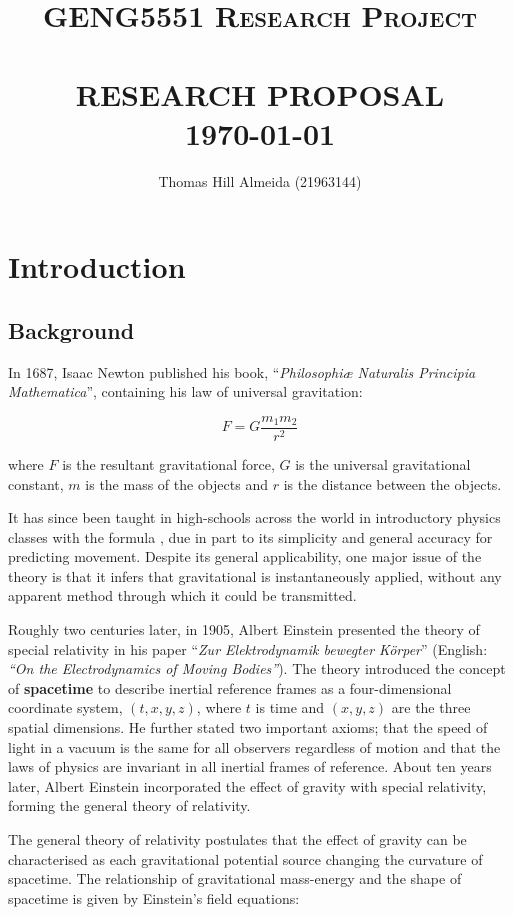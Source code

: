\documentclass{article}
\title{\normalsize \textsc{GENG5551 Research Project}
        \\ [1.5cm]
        \HRule{0.5pt} \\
        \LARGE \textbf{\uppercase{Research Proposal}}
        \HRule{2pt} \\ [0.5cm]
        \normalsize \today \vspace*{3\baselineskip}}
\author{Thomas Hill Almeida (21963144)}
\date{}
\begin{document}
\maketitle{}
\tableofcontents{}
\newpage{}

\section{Introduction}
\subsection{Background}

In 1687, Isaac Newton published his book, ``\textit{Philosophi\ae{} Naturalis Principia
Mathematica}'', containing his law of universal gravitation:

\begin{equation}
    F = G\dfrac{m_1m_2}{r^2}
\end{equation}

where \(F\) is the resultant gravitational force, \(G\) is the universal gravitational constant,
\(m\) is the mass of the objects and \(r\) is the distance between the objects.

It has since been taught in high-schools across the world in introductory physics classes with the
formula , due in part to its simplicity and general accuracy for predicting movement. Despite its
general applicability, one major issue of the theory is that it infers that gravitational is
instantaneously applied, without any apparent method through which it could be transmitted.

Roughly two centuries later, in 1905, Albert Einstein presented the theory of special relativity
in his paper ``\textit{Zur Elektrodynamik bewegter K{\"o}rper}'' (English: \textit{``On the
Electrodynamics of Moving Bodies''}). The theory introduced the concept of \textbf{spacetime} to
describe inertial reference frames as a four-dimensional coordinate system, \((t, x, y, z)\), where
$t$ is time and $(x, y, z)$ are the three spatial dimensions. He further stated two important
axioms; that the speed of light in a vacuum is the same for all observers regardless of motion and
that the laws of physics are invariant in all inertial frames of reference. About ten years later,
Albert Einstein incorporated the effect of gravity with special relativity, forming the general
theory of relativity.

The general theory of relativity postulates that the effect of gravity can be characterised as each
gravitational potential source changing the curvature of spacetime. The relationship of
gravitational mass-energy and the shape of spacetime is given by Einstein's field equations:
\end{document}
